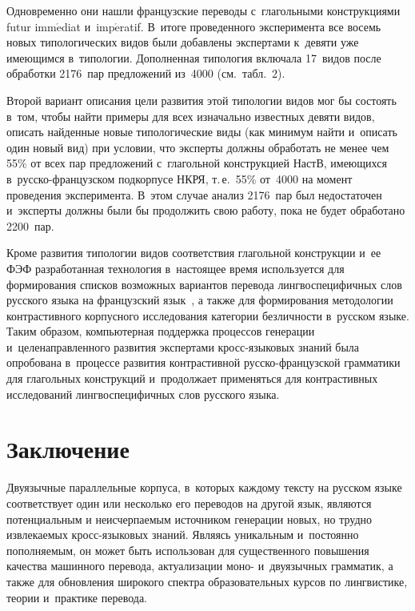 {\begin{multicols}{2}
      
      Одновременно они нашли французские переводы с~глагольными конструкциями 
futur imm$\acute{\mbox{e}}$diat и~imp$\acute{\mbox{e}}$ratif. В~итоге проведенного 
эксперимента все восемь новых типологических видов были добавлены экспертами 
к~девяти уже имеющимся в~типологии. Дополненная типология включала 17~видов после 
обработки 2176~пар предложений из~4000 (см.\ табл.~2).
      
      Второй вариант описания цели развития этой типологии видов мог бы состоять 
      в~том, чтобы \mbox{найти} примеры для всех изначально известных девяти видов, 
      описать 
найденные новые типологические виды (как минимум найти и~описать один новый вид) при 
условии, что эксперты должны обработать не менее чем 55\% от всех пар предложений 
с~глагольной конструкцией НастВ, имеющихся в~рус\-ско-фран\-цуз\-ском подкорпусе НКРЯ, 
т.\,е.\ 55\% от~4000 на момент проведения эксперимента. В~этом случае анализ 2176~пар 
был недостаточен и~эксперты должны были бы продолжить свою работу, пока не будет 
обработано 2200~пар.
      
      Кроме развития типологии видов соответствия глагольной конструкции и~ее ФЭФ 
разработанная технология в~настоящее время используется для формирования списков 
возможных вариантов перевода лингвоспецифичных слов русского языка на французский 
язык~\cite{37-zat}, а также для формирования методологии контрастивного корпусного 
исследования категории безличности в~русском языке. Таким образом, компьютерная 
поддержка процессов генерации и~целенаправленного развития экспертами  
кросс-язы\-ко\-вых знаний была опробована в~процессе развития контрастивной  
рус\-ско-фран\-цуз\-ской грамматики для глагольных конструкций и~продолжает 
применяться для контрастивных исследований лингвоспецифичных слов русского языка.

\section{Заключение}

      Двуязычные параллельные корпуса, в~которых каждому тексту на русском языке 
соответствует один или несколько его переводов на другой язык, являются потенциальным 
и неисчерпаемым источником генерации новых, но трудно извлека\-емых кросс-язы\-ко\-вых 
знаний. Являясь уникальным и~постоянно пополняемым, он может быть использован для 
существенного повышения качества машинного перевода, актуализации моно- 
и~двуязычных грамматик, а также для обновления широкого спектра образовательных курсов 
по лингвистике, теории и~практике перевода.
      

\end{multicols}}
